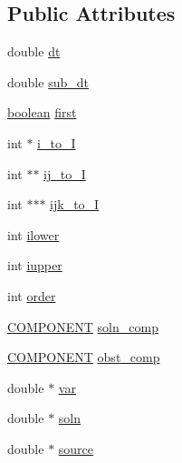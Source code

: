 \subsection*{Public Attributes}
\begin{DoxyCompactItemize}
\item 
double \hyperlink{class_p_a_r_a_b_o_l_i_c___s_o_l_v_e_r_a1c08d24beb1f1fa0e09811e11645f372}{dt}
\item 
double \hyperlink{class_p_a_r_a_b_o_l_i_c___s_o_l_v_e_r_a0de489f53fefae341770af1a384d32a0}{sub\+\_\+dt}
\item 
\hyperlink{cdecs_8h_ad048433382a936258fb49e2ec4f148e1}{boolean} \hyperlink{class_p_a_r_a_b_o_l_i_c___s_o_l_v_e_r_a99ecfd2dbd0d48d38db2d8344b665560}{first}
\item 
int $\ast$ \hyperlink{class_p_a_r_a_b_o_l_i_c___s_o_l_v_e_r_ae7201a2397f418c2a05e2d404fcdecab}{i\+\_\+to\+\_\+I}
\item 
int $\ast$$\ast$ \hyperlink{class_p_a_r_a_b_o_l_i_c___s_o_l_v_e_r_a6484125b65299e997d9b409bd80964f0}{ij\+\_\+to\+\_\+I}
\item 
int $\ast$$\ast$$\ast$ \hyperlink{class_p_a_r_a_b_o_l_i_c___s_o_l_v_e_r_a2f9d02128d4d11499ff818ff68923618}{ijk\+\_\+to\+\_\+I}
\item 
int \hyperlink{class_p_a_r_a_b_o_l_i_c___s_o_l_v_e_r_abbbd21cd192da51dc1e1fa6a77ff5798}{ilower}
\item 
int \hyperlink{class_p_a_r_a_b_o_l_i_c___s_o_l_v_e_r_acbfdd531448b5b7e12bc0b10df804ca4}{iupper}
\item 
int \hyperlink{class_p_a_r_a_b_o_l_i_c___s_o_l_v_e_r_aaa48005f554a737dedc1c0402a020726}{order}
\item 
\hyperlink{int_8h_a2bb7be12ca59ea6443c8757df0a7c278}{C\+O\+M\+P\+O\+N\+E\+NT} \hyperlink{class_p_a_r_a_b_o_l_i_c___s_o_l_v_e_r_a0c6524d8f6e5bda3ce2cdcb29109be70}{soln\+\_\+comp}
\item 
\hyperlink{int_8h_a2bb7be12ca59ea6443c8757df0a7c278}{C\+O\+M\+P\+O\+N\+E\+NT} \hyperlink{class_p_a_r_a_b_o_l_i_c___s_o_l_v_e_r_a9d3b02786e4ce9b05dd11bf6cdbe1daf}{obst\+\_\+comp}
\item 
double $\ast$ \hyperlink{class_p_a_r_a_b_o_l_i_c___s_o_l_v_e_r_afba149cd7f4788988a0d679bd64674f2}{var}
\item 
double $\ast$ \hyperlink{class_p_a_r_a_b_o_l_i_c___s_o_l_v_e_r_a4c49b2af87011c54909bc1c24e10f754}{soln}
\item 
double $\ast$ \hyperlink{class_p_a_r_a_b_o_l_i_c___s_o_l_v_e_r_a1d70c833e08d91fbe39bf7d3279e8b54}{source}
\item 
$$
\end{DoxyCompactItemize}
